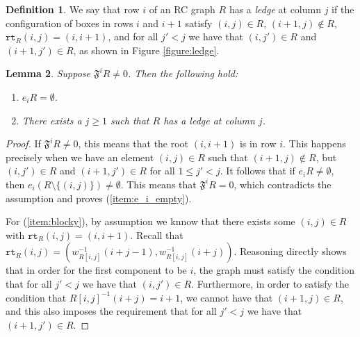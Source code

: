 \documentclass{amsart}
\newtheorem{lemma}{Lemma}[subsection]
\theoremstyle{definition}
\newtheorem{definition}[lemma]{Definition}
\theoremstyle{remark}
\numberwithin{equation}{subsection}
\newcommand{\wof}[1]{w_{#1}}
\newcommand{\rcdd}{\mathfrak{F}}
\newcommand{\rtt}{\mathtt{rt}}
\begin{document}
  \begin{definition}
We say that row $i$ of an RC graph $R$ has a \emph{ledge} at column $j$ if the configuration of boxes in rows $i$ and $i+1$ satisfy $(i,j)\in R$, $(i+1,j)\notin  R$, $\rtt_R(i,j)=(i,i+1)$, and for all $j' < j$ we have that $(i,j')\in R$ and $(i+1,j')\in R$, as shown in Figure \ref{figure:ledge}.
\end{definition}

\begin{lemma} \label{lemma:block_structure}
Suppose $\rcdd^iR\neq 0$. Then the following hold:
\begin{enumerate}
\item \label{item:e_i_empty} $e_iR=\emptyset$.
\item \label{item:blocky} There exists a $j\geq 1$ such that $R$ has a ledge at column $j$.
\end{enumerate}
\end{lemma}
\begin{proof}
If $\rcdd^iR\neq 0$, this means that the root $(i, i+1)$ is in row $i$. This happens precisely when we have an element $(i,j)\in R$ such that $(i+1, j)\notin R$, but $(i, j')\in R$ and $(i+1, j')\in R$ for all $1\leq j'<j$. It follows that if $e_iR\neq \emptyset$, then $e_i(R\setminus\{(i,j)\})\neq \emptyset$. This means that $\rcdd^iR=0$, which contradicts the assumption and proves (\ref{item:e_i_empty}).

For (\ref{item:blocky}), by assumption we knnow that there exists some $(i,j)\in R$ with $\rtt_R(i,j)=(i,i+1)$. Recall that $\rtt_R(i,j) = (\wof{R[i,j]}^{-1}(i + j -1), \wof{R[i,j]}^{-1}(i+j))$. Reasoning directly shows that in order for the first component to be $i$, the graph must satisfy the condition that for all $j' < j$ we have that $(i,j')\in R$. Furthermore, in order to satisfy the condition that $R[i,j]^{-1}(i+j) = i+1$, we cannot have that $(i+1,j)\in R$, and this also imposes the requirement that for all $j' < j$ we have that $(i+1,j')\in R$.
\end{proof}
\end{document}
